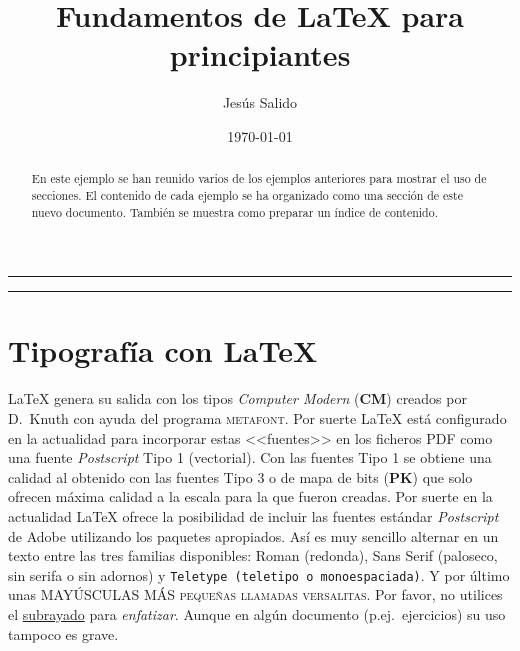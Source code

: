 \documentclass[11pt,a4paper]{article}
\author{Jesús Salido}
\title{Fundamentos de \LaTeX{} para principiantes}
\date{\today}
\begin{document}
\maketitle 

\begin{abstract}
	En este ejemplo se han reunido varios de los ejemplos anteriores para mostrar el uso de secciones. El contenido de cada ejemplo se ha organizado como una sección de este nuevo documento. También se muestra como preparar un índice de contenido.
\end{abstract}




\hrule %
\tableofcontents %
\vspace{0.5cm} %
\hrule

\section{Tipografía con \LaTeX{}}
\label{sec:tipos} %

\LaTeX{} genera su salida con los tipos \emph{Computer Modern} (\textbf{CM}) creados por D.~Knuth con ayuda del programa \textsc{metafont}. Por suerte \LaTeX{} está configurado en la actualidad para incorporar estas <<fuentes>> en los ficheros PDF como una fuente \emph{Postscript} Tipo 1 (vectorial). Con las fuentes Tipo 1 se obtiene una calidad al obtenido con las fuentes Tipo 3 o de mapa de bits (\textbf{PK}) que solo ofrecen máxima calidad a la escala para la que fueron creadas. Por suerte en la actualidad \LaTeX{} ofrece la posibilidad de incluir las fuentes estándar \emph{Postscript} de \textsf{Adobe} utilizando los paquetes apropiados. Así es muy sencillo alternar en un texto entre las tres familias disponibles: Roman (redonda), \textsf{Sans Serif (paloseco, sin serifa o sin adornos)} y \texttt{Teletype (teletipo o monoespaciada)}. Y por último unas MAYÚSCULAS MÁS \textsc{pequeñas llamadas versalitas}. Por favor, no utilices el \underline{subrayado} para \emph{enfatizar}. Aunque en algún documento (p.ej.\ ejercicios) su uso tampoco es grave.
\end{document}

